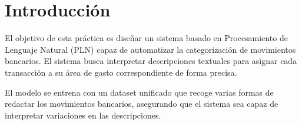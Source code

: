 \section{Introducción}
\label{sec:introduccion}

El objetivo de esta práctica es diseñar un sistema basado en Procesamiento de Lenguaje Natural (PLN) capaz de automatizar la categorización de movimientos bancarios. El sistema busca interpretar descripciones textuales para asignar cada transacción a su área de gasto correspondiente de forma precisa.

El modelo se entrena con un dataset unificado que recoge varias formas de redactar los movimientos bancarios, asegurando que el sistema sea capaz de interpretar variaciones en las descripciones.